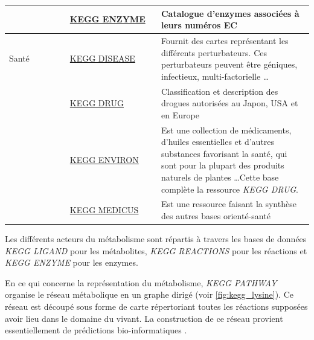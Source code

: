\begin{refsegment}
\begin{table}[H]
\begin{tabular}{p{0.2\linewidth}|p{0.3\linewidth}|p{0.5\linewidth}}
            \cline{2-3}             & \href{http://www.genome.jp/kegg/annotation/enzyme.html}{KEGG ENZYME}  & Catalogue d'enzymes associées                                                                                                                                                                                                                                                                                               à leurs numéros \acrfull{EC}\\
            \hline
            Santé                   & \href{http://www.genome.jp/kegg/disease/}{KEGG DISEASE}               & Fournit des cartes représentant les différents perturbateurs. Ces perturbateurs peuvent être géniques, infectieux, multi-factorielle \ldots\\
            \cline{2-3}             & \href{http://www.genome.jp/kegg/drug/}{KEGG DRUG}                     & Classification et description des drogues autorisées au Japon, USA et en Europe\\
            \cline{2-3}             & \href{http://www.genome.jp/kegg/drug/environ.html}{KEGG ENVIRON}      & Est une collection de médicaments, d'huiles essentielles et d'autres substances favorisant la santé, qui sont pour la plupart des produits naturels de plantes \ldots Cette base complète la ressource \textit{KEGG DRUG}.\\
            \cline{2-3}             & \href{http://www.genome.jp/kegg/medicus.html}{KEGG MEDICUS}           & Est une ressource faisant la synthèse des autres  bases orienté-santé \\
            \bottomrule
        \end{tabular}
    \end{table}
    
    
    Les différents acteurs du métabolisme sont répartis à travers les bases de données \textit{KEGG LIGAND} pour les métabolites, \textit{KEGG REACTIONS} pour les réactions et \textit{KEGG ENZYME} pour les enzymes.
    
    En ce qui concerne la représentation du métabolisme, \textit{KEGG PATHWAY} organise le réseau métabolique en un graphe dirigé (voir \cref{fig:kegg_lysine}). Ce réseau est découpé sous forme de carte répertoriant toutes les réactions supposées avoir lieu dans le domaine du vivant. La construction de ce réseau provient essentiellement de prédictions bio-informatiques .
    

\end{refsegment}
